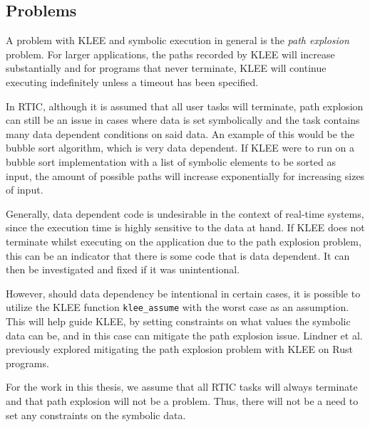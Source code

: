 \subsection{Problems}
A problem with KLEE and symbolic execution in general is the \emph{path
explosion} problem. For larger applications, the paths recorded by KLEE will
increase substantially and for programs that never terminate, KLEE will
continue executing indefinitely unless a timeout has been specified.

In RTIC, although it is assumed that all user tasks will terminate, path
explosion can still be an issue in cases where data is set symbolically and the
task contains many data dependent conditions on said data. An example of this
would be the bubble sort algorithm, which is very data dependent. If KLEE were
to run on a bubble sort implementation with a list of symbolic elements to be
sorted as input, the amount of possible paths will increase exponentially for
increasing sizes of input.

Generally, data dependent code is undesirable in the context of real-time
systems, since the execution time is highly sensitive to the data at hand. If
KLEE does not terminate whilst executing on the application due to the path
explosion problem, this can be an indicator that there is some code that is
data dependent. It can then be investigated and fixed if it was unintentional.

However, should data dependency be intentional in certain cases, it is possible
to utilize the KLEE function \texttt{klee\_assume}\cite{kleeintrinsics} with
the worst case as an assumption. This will help guide KLEE, by setting
constraints on what values the symbolic data can be, and in this case can
mitigate the path explosion issue. Lindner et al. previously explored
mitigating the path explosion problem with KLEE on Rust programs\cite{nopanic}.

For the work in this thesis, we assume that all RTIC tasks will always
terminate and that path explosion will not be a problem. Thus, there will
not be a need to set any constraints on the symbolic data.
